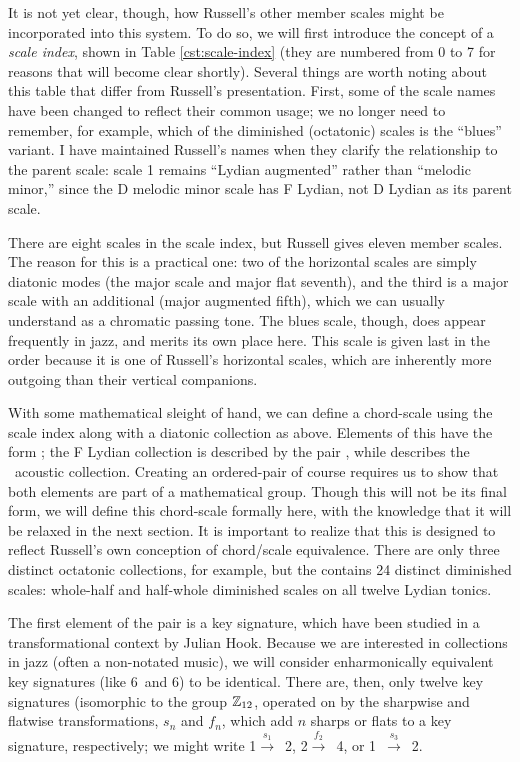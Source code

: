 It is not yet clear, though, how Russell's other member scales might be
incorporated into this system. To do so, we will first introduce the concept
of a \emph{scale index}, shown in Table \ref{cst:scale-index} (they are
numbered from 0 to 7 for reasons that will become clear shortly). Several
things are worth noting about this table that differ from Russell's
presentation. First, some of the scale names have been changed to reflect
their common usage; we no longer need to remember, for example, which of the
diminished (octatonic) scales is the ``blues'' variant. I have
maintained Russell's names when they clarify the relationship to the parent
scale: scale 1 remains ``Lydian augmented'' rather than ``melodic minor,''
since the D melodic minor scale has F Lydian, not D Lydian as its parent scale.

There are eight scales in the scale index, but Russell gives eleven member
scales. The reason for this is a practical one: two of the horizontal scales
are simply diatonic modes (the major scale and major flat seventh), and the
third is a major scale with an additional \sharp{} (major augmented
fifth), which we can usually understand as a chromatic passing tone. The blues
scale, though, does appear frequently in jazz, and merits its own place
here. This scale is given last in the order because it is one of
Russell's horizontal scales, which are inherently more outgoing than their
vertical companions.

With some mathematical sleight of hand, we can define a chord-scale \gis using
the scale index along with a diatonic collection as above. Elements of this
\gis have the form ;
the F Lydian collection is described by the pair ,
while  describes the \Eflat\ acoustic
collection. Creating an ordered-pair \gis of course requires us to show that
both elements are part of a mathematical group. Though this will not be its
final form, we will define this chord-scale \gis formally
here, with the knowledge that it will be relaxed in the next section. It is
important to realize that this \gis is designed to reflect Russell's own conception
of chord/scale equivalence. There are only three distinct octatonic
collections, for example, but the \gis contains 24 distinct diminished scales:
whole-half and half-whole diminished scales on all twelve Lydian tonics.

The first element of the pair is a key signature, which have been studied in a
transformational context by Julian Hook. Because we are interested
in collections in jazz (often a non-notated music), we will consider
enharmonically equivalent key signatures (like 6\sharp\ and 6\kern0.8pt\flat)
to be identical. There are, then, only twelve key signatures (isomorphic to
the group $\mathbb{Z}_{12}$, operated on by the sharpwise and flatwise
transformations, $s_n$ and $f_n$, which add $n$ sharps or flats to a key
signature, respectively; we might write \mbox{1\sharp $\xrightarrow{\ s_1\ }$
  2\sharp}, \mbox{2\flat $\xrightarrow{\ f_2\ }$ 4\flat}, or \mbox{1\flat
  $\xrightarrow{\ s_3\ }$ 2\sharp}.

